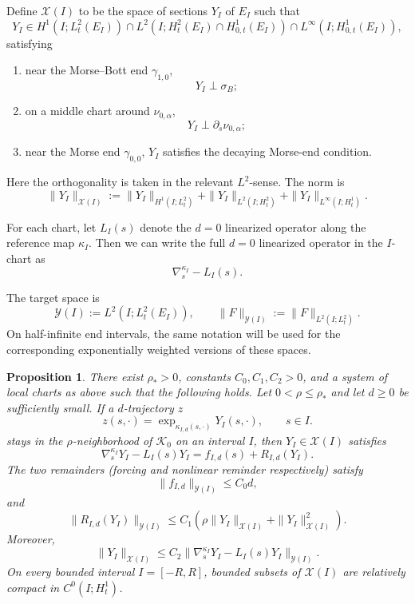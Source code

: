 \documentclass[11pt]{amsart}
\theoremstyle{plain}
\newtheorem{prop}[thm]{Proposition}
\theoremstyle{definition}
\begin{document}
Define $\mathcal X(I)$ to be the
space of sections $Y_I$ of $E_I$ such that
\[
Y_I\in H^1(I;L_t^2(E_I))\cap
L^2(I;H_t^2(E_I)\cap H^1_{0,t}(E_I))
\cap L^\infty(I;H^1_{0,t}(E_I)),
\]
satisfying 
\begin{enumerate}[label=\textup{(\alph*)}]
\setlength{\itemsep}{-1pt}
    \item near the Morse--Bott end $\gamma_{1,0}$, 
    \[Y_I \perp \sigma_B;\]
    \item on a middle chart around $\nu_{0,\alpha}$,
    \[Y_I \perp \partial_s\nu_{0,\alpha};\]
    \item near the Morse end $\gamma_{0,0}$, $Y_I$ satisfies the decaying Morse-end condition.
\end{enumerate}
Here the orthogonality is taken in the relevant $L^2$-sense. The norm is
\[
\|Y_I\|_{\mathcal X(I)}:=\|Y_I\|_{H^1(I;L_t^2)}+
\|Y_I\|_{L^2(I;H_t^2)}+\|Y_I\|_{L^\infty(I;H_t^1)}.
\]


For each chart, let $L_I(s)$ denote the $d=0$ linearized operator along the reference map $\kappa_I$. Then we can write the full $d=0$ linearized operator in the $I$-chart as
\[
\nabla_s^{\kappa_I}-L_I(s).
\]

The target space is
\[
\mathcal Y(I):=L^2(I;L_t^2(E_I)),\qquad
\|F\|_{\mathcal Y(I)}:=\|F\|_{L^2(I;L_t^2)}.
\]
On half-infinite end intervals, the same notation will be used for the
corresponding exponentially weighted versions of these spaces.


\begin{prop}\label{prop:YIestimate}
There exist $\rho_*>0$, constants $C_0,C_1,C_2>0$, and a system of local
charts as above such that the following holds. Let $0<\rho\le\rho_*$ and let $d\ge0$ be sufficiently small. If a $d$-trajectory $z$
\[
z(s,\cdot)=\exp_{\kappa_{I,d}(s,\cdot)}Y_I(s,\cdot),\qquad s\in I.
\]
stays in the $\rho$-neighborhood of $\mathcal{K}_0$ on an interval $I$, then 
$Y_I\in\mathcal X(I)$ satisfies
\[
\nabla_s^{\kappa_I}Y_I-L_I(s)Y_I
=f_{I,d}(s)+R_{I,d}(Y_I).
\]
The two remainders (forcing and nonlinear reminder respectively) satisfy
\[
\|f_{I,d}\|_{\mathcal Y(I)}\le C_0d,
\]
and
\[
\|R_{I,d}(Y_I)\|_{\mathcal Y(I)}
\le C_1\left(\rho\|Y_I\|_{\mathcal X(I)}
+\|Y_I\|_{\mathcal X(I)}^2\right).
\]
Moreover, %
\[
\|Y_I\|_{\mathcal X(I)}\le
C_2\|\nabla_s^{\kappa_I}Y_I-L_I(s)Y_I\|_{\mathcal Y(I)}.
\]
On every bounded interval $I=[-R,R]$, bounded subsets of $\mathcal X(I)$
are relatively compact in $C^0(I;H_t^1)$.
\end{prop}
\end{document}

